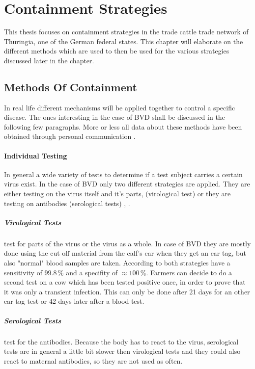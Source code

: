 \section{Containment Strategies}\label{chap:containmentBasics}
This thesis focuses on containment strategies in the trade cattle trade network of Thuringia, one of the German federal states. This chapter will elaborate on the different methods which are used to then be used for the various strategies discussed later in the chapter.

\subsection{Methods Of Containment}
In real life different mechanisms will be applied together to control a specific disease. The ones interesting in the case of BVD shall be discussed in the following few paragraphs. More or less all data about these methods have been obtained through personal communication \citep{personalCom}.

\paragraph{Individual Testing}
In general a wide variety of tests to determine if a test subject carries a certain virus exist. In the case of BVD only two different strategies are applied. They are either testing on the virus itself and it's parts, (virological test) or they are testing on antibodies (serological tests) \citep{haller1999diagnostik}, \citep{personalCom}. 

\subparagraph{Virological Tests} test for parts of the virus or the virus as a whole. In case of BVD they are mostly done using the cut off material from the calf's ear when they get an ear tag, but also "normal" blood samples are taken. According to \citep{personalCom} both strategies have a sensitivity of $99.8\,\%$ and a specifity of $\approx 100\,\%$. Farmers can decide to do a second test on a cow which has been tested positive once, in order to prove that it was only a transient infection. This can only be done after 21 days for an other ear tag test or 42 days later after a blood test.

\subparagraph{Serological Tests} test for the antibodies. Because the body has to react to the virus, serological tests are in general a little bit slower then virological tests and they could also react to maternal antibodies, so they are not used as often.

